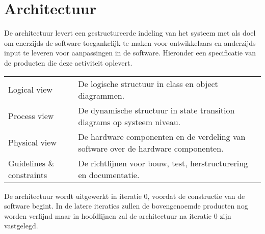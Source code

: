 
\section{Architectuur}

De architectuur levert een gestructureerde indeling van het systeem met als doel om enerzijds de software
toegankelijk te maken voor ontwikkelaars en anderzijds input te leveren voor aanpassingen in de software. Hieronder
een specificatie van de producten die deze activiteit oplevert.

{\tiny
\begin{center}
\begin{tabular}{lp{30em}}
Logical view & De logische structuur in class en object diagrammen.\\
Process view & De dynamische structuur in state
transition diagrams op systeem niveau.\\
Physical view &  De hardware componenten en de verdeling van
software over de hardware componenten.\\
Guidelines \& constraints & De richtlijnen voor bouw,
test, herstructurering en documentatie.\\
\end{tabular}
\end{center}
}

De architectuur wordt uitgewerkt in iteratie 0, voordat de constructie van de software begint. In de latere iteraties
zullen de bovengenoemde producten nog worden verfijnd maar in hoofdlijnen zal de architectuur na iteratie 0 zijn vastgelegd.